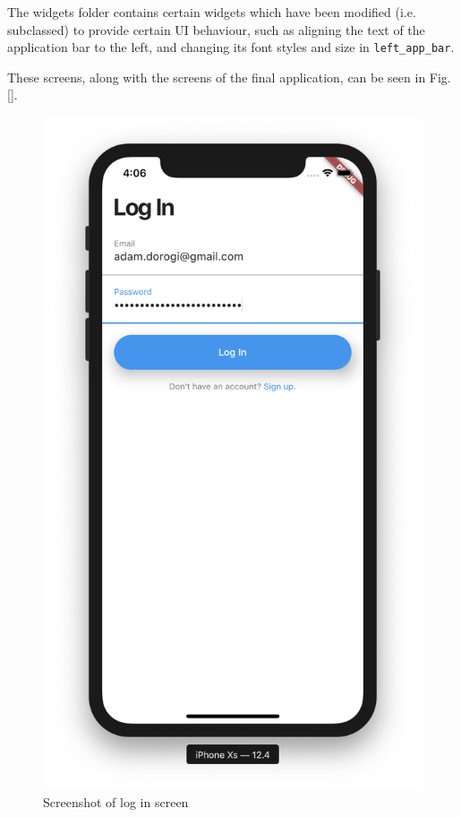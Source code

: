 \documentclass[12pt,openany,a4paper]{book}
\newcommand{\fig}[1]  {Fig.\,\ref{#1}}		%
\begin{document}
The widgets folder contains certain widgets which have been modified (i.e.
subclassed) to provide certain UI behaviour, such as aligning the text of the
application bar to the left, and changing its font styles and size in \verb|left_app_bar|.

These screens, along with the screens of the final application, can be seen in
\fig{}.


\begin{figure}[h]
	\centering\includegraphics[width=\textwidth]{LogInScreen.png}
	\caption{Screenshot of log in screen}
	\label{fig:log_in_screen}
	\end{figure}
\end{document}
